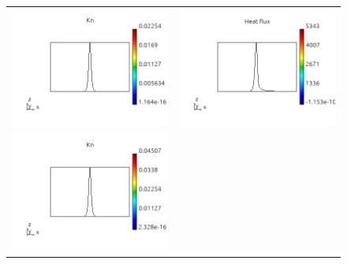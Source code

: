 \documentclass[review]{elsarticle}
\begin{document}
\begin{figure}[tbh]
\begin{center}
\begin{tabular}{cc}
      \includegraphics[width=\psize\textwidth]{figs/Kn_p71D1e8.png} &
      \includegraphics[width=\psize\textwidth]{figs/hflux_p71D1e8.png} \\
      \includegraphics[width=\psize\textwidth]{figs/Kn_p71D5e7.png} &

\end{tabular}
\end{center}
\end{figure}
\end{document}
